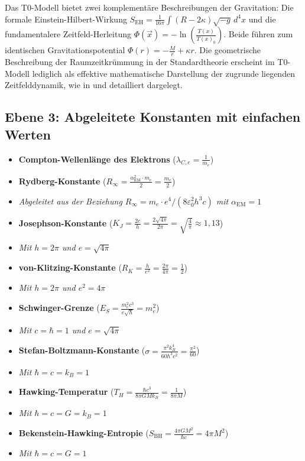\documentclass[12pt,a4paper]{article}
\newcommand{\Tfield}{T(x)}
\newcommand{\alphaEM}{\alpha_{\text{EM}}}
\begin{document}
Das T0-Modell bietet zwei komplementäre Beschreibungen der Gravitation: Die formale Einstein-Hilbert-Wirkung $S_{\mathrm{EH}} = \frac{1}{16\pi} \int (R - 2\kappa) \sqrt{-g} \, d^4x$ und die fundamentalere Zeitfeld-Herleitung $\Phi(\vec{x}) = -\ln\left(\frac{\Tfield}{\Tfield_0}\right)$. Beide führen zum identischen Gravitationspotential $\Phi(r) = -\frac{M}{r} + \kappa r$. Die geometrische Beschreibung der Raumzeitkrümmung in der Standardtheorie erscheint im T0-Modell lediglich als effektive mathematische Darstellung der zugrunde liegenden Zeitfelddynamik, wie in \cite{pascher_emergente_gravitation_2025} und \cite{pascher_lagrange_2025} detailliert dargelegt.

\subsection*{Ebene 3: Abgeleitete Konstanten mit einfachen Werten}
\begin{itemize}[itemsep=0.5em]
	\item \textbf{Compton-Wellenlänge des Elektrons} (\(\lambda_{C,e} = \frac{1}{m_e}\))
	\item \textbf{Rydberg-Konstante} (\(R_\infty = \frac{\alphaEM^2 \cdot m_e}{2} = \frac{m_e}{2}\))
	\item[] \textit{Abgeleitet aus der Beziehung $R_\infty = m_e\cdot e^4/(8\varepsilon_0^2h^3c)$ mit $\alphaEM = 1$}
	\item \textbf{Josephson-Konstante} (\(K_J = \frac{2e}{h} = \frac{2\sqrt{4\pi}}{2\pi} = \sqrt{\frac{4}{\pi}} \approx 1,13\))
	\item[] \textit{Mit $h = 2\pi$ und $e = \sqrt{4\pi}$}
	\item \textbf{von-Klitzing-Konstante} (\(R_K = \frac{h}{e^2} = \frac{2\pi}{4\pi} = \frac{1}{2}\))
	\item[] \textit{Mit $h = 2\pi$ und $e^2 = 4\pi$}
	\item \textbf{Schwinger-Grenze} (\(E_S = \frac{m_e^2c^3}{e\sqrt{\hbar}} = m_e^2\))
	\item[] \textit{Mit $c = \hbar = 1$ und $e = \sqrt{4\pi}$}
	\item \textbf{Stefan-Boltzmann-Konstante} (\(\sigma = \frac{\pi^2k_B^4}{60\hbar^3c^2} = \frac{\pi^2}{60}\))
	\item[] \textit{Mit $\hbar = c = k_B = 1$}
	\item \textbf{Hawking-Temperatur} (\(T_H = \frac{\hbar c^3}{8\pi GMk_B} = \frac{1}{8\pi M}\))
	\item[] \textit{Mit $\hbar = c = G = k_B = 1$}
	\item \textbf{Bekenstein-Hawking-Entropie} (\(S_{\mathrm{BH}} = \frac{4\pi GM^2}{\hbar c} = 4\pi M^2\))
	\item[] \textit{Mit $\hbar = c = G = 1$}
\end{itemize}
\end{document}
